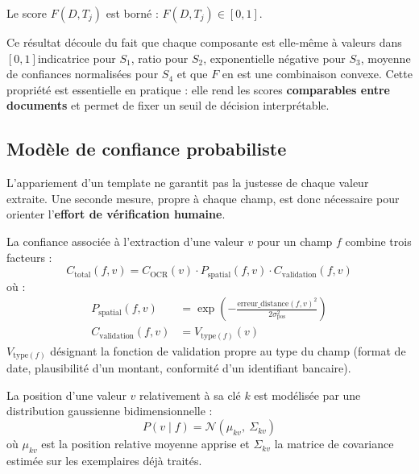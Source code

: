 \begin{theoreme}
\label{th:bornitude}
Le score $F(D, T_j)$ est borné : $F(D, T_j) \in [0, 1]$.
\end{theoreme}

Ce résultat découle du fait que chaque composante est elle-même à valeurs dans $[0,1]$indicatrice pour $S_1$, ratio pour $S_2$, exponentielle négative pour $S_3$, moyenne de
confiances normalisées pour $S_4$  et que $F$ en est une combinaison convexe. Cette
propriété est essentielle en pratique : elle rend les scores \textbf{comparables entre
documents} et permet de fixer un seuil de décision interprétable.

\subsection{Modèle de confiance probabiliste}
\label{subsec:confiance}

L'appariement d'un template ne garantit pas la justesse de chaque valeur extraite. Une
seconde mesure, propre à chaque champ, est donc nécessaire pour orienter l'\textbf{effort de
vérification humaine}.

\begin{definition}
\label{def:confiance-totale}
La confiance associée à l'extraction d'une valeur $v$ pour un champ $f$ combine trois
facteurs :
\begin{equation}
C_{\text{total}}(f, v) = C_{\text{OCR}}(v)\cdot P_{\text{spatial}}(f, v)\cdot C_{\text{validation}}(f, v)
\end{equation}
où :
\begin{align}
P_{\text{spatial}}(f, v) &= \exp\!\left(-\frac{\mathrm{erreur\_distance}(f, v)^2}{2\sigma_{\text{pos}}^2}\right)\\
C_{\text{validation}}(f, v) &= V_{\mathrm{type}(f)}(v)
\end{align}
$V_{\mathrm{type}(f)}$ désignant la fonction de validation propre au type du champ (format de
date, plausibilité d'un montant, conformité d'un identifiant bancaire).
\end{definition}



\begin{definition}
\label{def:modele-spatial}
La position d'une valeur $v$ relativement à sa clé $k$ est modélisée par une distribution
gaussienne bidimensionnelle :
\begin{equation}
P(v \mid f) = \mathcal{N}(\mu_{kv},\ \Sigma_{kv})
\end{equation}
où $\mu_{kv}$ est la position relative moyenne apprise et $\Sigma_{kv}$ la matrice de
covariance estimée sur les exemplaires déjà traités.
\end{definition}

